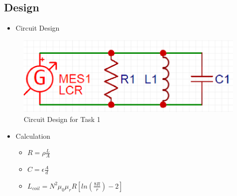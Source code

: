 \documentclass[journal, letterpaper]{IEEEtran}
\begin{document}
    \subsection{Design}
    	\begin{itemize}
    	\item Circuit Design
    	\end{itemize}
        \begin{figure}[!hbt]
		\begin{center}
		\includegraphics[width=\columnwidth]{l7_1}
		\caption{Circuit Design for Task 1}
		\label{fig:l7_1}
		\end{center}
	\end{figure}
    \newpage
    \begin{itemize}
		\item Calculation
          \begin{flushleft}
              \begin{multicols}{2}
                  \begin{itemize}
                      \item $R = \rho\frac{L}{A}$
                      \item $C = \epsilon\frac{A}{d}$
                      \item $L_{coil} = N^{2}\mu_{0}\mu_{r}R[ln(\frac{8R}{r})-2]$
                  \end{itemize}
              \end{multicols}
          \end{flushleft}
    \end{itemize}
\end{document}
